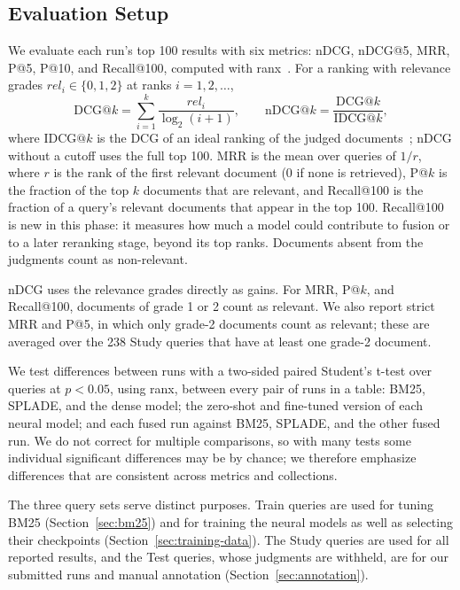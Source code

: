 \documentclass[sigconf,nonacm]{acmart}
\begin{document}
\subsection{Evaluation Setup}
\label{sec:eval}
We evaluate each run's top 100 results with six metrics: nDCG, nDCG@5, MRR, 
P@5, P@10, and Recall@100, computed with ranx~\cite{bassani2022ranx}. For a 
ranking with relevance grades 
$\mathit{rel}_i \in \{0, 1, 2\}$ at ranks $i = 1, 2, \dots$,
\begin{equation}
  \mathrm{DCG@}k = \sum_{i=1}^{k} \frac{\mathit{rel}_i}{\log_2(i + 1)},
  \qquad
  \mathrm{nDCG@}k = \frac{\mathrm{DCG@}k}{\mathrm{IDCG@}k},
  \label{eq:ndcg}
\end{equation}
where $\mathrm{IDCG@}k$ is the DCG of an ideal ranking of the judged 
documents~\cite{jarvelin2002cumulated}; nDCG without a cutoff uses the full top 100. 
MRR is the mean over queries of $1/r$, where $r$ is the rank of the first relevant 
document (0 if none is retrieved), P@$k$ is the fraction of the top $k$ documents 
that are relevant, and Recall@100 is the fraction of a query's relevant documents 
that appear in the top 100. Recall@100 is new in this phase: it measures how much 
a model could contribute to fusion or to a later reranking stage, beyond its top 
ranks. Documents absent from the judgments count as non-relevant.

nDCG uses the relevance grades directly as gains. For MRR, P@$k$, and Recall@100, 
documents of grade 1 or 2 count as relevant. We also report strict MRR and P@5, in 
which only grade-2 documents count as relevant; these are averaged over the 238 Study 
queries that have at least one grade-2 document.

We test differences between runs with a two-sided paired Student's t-test over 
queries at $p < 0.05$, using ranx, between every pair of runs in a table: BM25, 
SPLADE, and the dense model; the zero-shot and fine-tuned version of each neural 
model; and each fused run against BM25, SPLADE, and the other fused run. We do not 
correct for multiple comparisons, so with many tests some individual significant 
differences may be by chance; we therefore emphasize differences that are consistent 
across metrics and collections.

The three query sets serve distinct purposes. Train queries are used for tuning 
BM25 (Section~\ref{sec:bm25}) and for training the neural models as well as selecting their 
checkpoints (Section~\ref{sec:training-data}). The Study queries are used for all reported 
results, and the Test queries, whose judgments are withheld, are for our submitted runs 
and manual annotation (Section~\ref{sec:annotation}).
\end{document}
